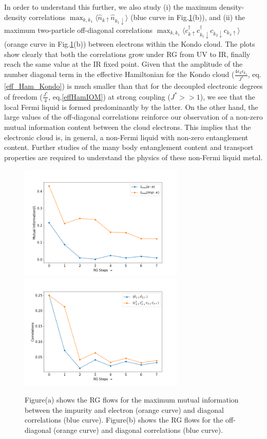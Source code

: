 \documentclass[aps,prb,preprint,groupedaddress]{revtex4-2}
\begin{document}
In order to understand this further, we also study (i) the maximum density-density correlations $\max_{k,k_{1}}\langle\hat{n}_{k\uparrow}\hat{n}_{k_{1}\downarrow}\rangle$ (blue curve in Fig.\ref{MI1}(b)), and (ii) the maximum two-particle off-diagonal correlations $\max_{k,k_{1}}\langle c^{\dagger}_{k\uparrow}c^{\dagger}_{k_{1}\downarrow}c_{k_{2}\downarrow}c_{k_{3}\uparrow}\rangle$ (orange curve in Fig.\ref{MI1}(b)) between electrons within the Kondo cloud. The plots show clearly that both the correlations grow under RG from UV to IR, finally reach the same value at the IR fixed point. Given that the amplitude of the number diagonal term in the effective Hamiltonian for the Kondo cloud ($\frac{4\epsilon_{k}\epsilon_{k_{1}}}{J^{*}}$, eq.\eqref{eff_Ham_Kondo}) is much smaller than that for the decoupled electronic degrees of freedom ($\frac{J^{*}}{4}$, eq.\eqref{effHamIOM}) at strong coupling ($J^{*}>>1$), we see that the local Fermi liquid is formed predominantly by the latter. On the other hand, the large values of the off-diagonal correlations reinforce our observation of a non-zero mutual information content between the cloud electrons. This implies that the electronic cloud is, in general, a non-Fermi liquid with non-zero entanglement content. Further studies of the many body entanglement content and transport properties are required to understand the physics of these non-Fermi liquid metal.
\begin{figure}
\begin{center}
\includegraphics[width=0.7\textwidth]{MIkondo.png}
\includegraphics[width=0.7\textwidth]{corrKondo.png}
\end{center}
\caption{Figure(a) shows the RG flows for the maximum mutual information between the impurity and electron (orange curve) and diagonal correlations (blue curve). Figure(b) shows the RG flows for the off-diagonal (orange curve) and diagonal correlations (blue curve).}\label{MI1}
\end{figure}
\end{document}
